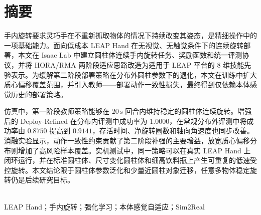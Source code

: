 

\section*{摘\quad 要}
\thesisbodyfont
手内旋转要求灵巧手在不重新抓取物体的情况下持续改变其姿态，是精细操作中的一项基础能力。面向低成本 LEAP Hand 在无视觉、无触觉条件下的连续旋转部署，本文在 Isaac Lab 中建立圆柱体连续手内旋转任务、奖励函数和统一评测协议，并将 HORA/RMA 两阶段适应思路改造为适用于 LEAP 平台的 \(8\) 维技能先验表示。为缓解第二阶段部署策略在分布外圆柱参数下的退化，本文在训练中扩大质心偏移覆盖范围，并引入教师——部署动作一致性损失，最终得到仅依赖本体感觉历史的部署策略。\par
仿真中，第一阶段教师策略能够在 \(20\,\mathrm{s}\) 回合内维持稳定的圆柱体连续旋转。增强后的 \(\mathrm{Deploy\text{-}Refined}\) 在分布内评测中成功率为 \(1.0000\)，在常规分布外评测中将成功率由 \(0.8750\) 提高到 \(0.9141\)，存活时间、净旋转圈数和轴向角速度也同步改善。消融实验显示，动作一致性约束贡献了第二阶段补强的主要增益，放宽质心偏移分布则增加了高风险样本覆盖。实机测试中，同一策略可以在真实 LEAP Hand 上闭环运行，并在标准圆柱体、尺寸变化圆柱体和细高饮料瓶上产生可重复的低速受控旋转。本文结论限于圆柱体参数泛化和少量近圆柱对象迁移，任意多物体稳定旋转仍是后续研究目标。\par
~\\
LEAP Hand；手内旋转；强化学习；本体感觉自适应；Sim2Real\\
